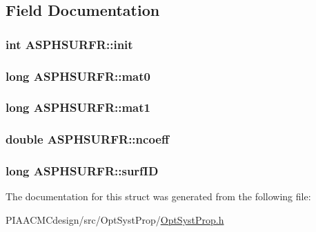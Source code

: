 \subsection{Field Documentation}
\hypertarget{structASPHSURFR_ae2386c06994cf2b5a8090bbdee2a7957}{
\subsubsection[{init}]{\setlength{\rightskip}{0pt plus 5cm}int A\+S\+P\+H\+S\+U\+R\+F\+R\+::init}}\label{structASPHSURFR_ae2386c06994cf2b5a8090bbdee2a7957}
\hypertarget{structASPHSURFR_a9c6a2f637f66b2911129ec69640f98d2}{
\subsubsection[{mat0}]{\setlength{\rightskip}{0pt plus 5cm}long A\+S\+P\+H\+S\+U\+R\+F\+R\+::mat0}}\label{structASPHSURFR_a9c6a2f637f66b2911129ec69640f98d2}
\hypertarget{structASPHSURFR_a0f31e31171389f94d70cc4ea0610e2a4}{
\subsubsection[{mat1}]{\setlength{\rightskip}{0pt plus 5cm}long A\+S\+P\+H\+S\+U\+R\+F\+R\+::mat1}}\label{structASPHSURFR_a0f31e31171389f94d70cc4ea0610e2a4}
\hypertarget{structASPHSURFR_a08fa1d82f1fc8040b051e608ea915aec}{
\subsubsection[{ncoeff}]{\setlength{\rightskip}{0pt plus 5cm}double A\+S\+P\+H\+S\+U\+R\+F\+R\+::ncoeff}}\label{structASPHSURFR_a08fa1d82f1fc8040b051e608ea915aec}
\hypertarget{structASPHSURFR_a1883e1812b5e228da6efc3fa85b88ff5}{
\subsubsection[{surf\+I\+D}]{\setlength{\rightskip}{0pt plus 5cm}long A\+S\+P\+H\+S\+U\+R\+F\+R\+::surf\+I\+D}}\label{structASPHSURFR_a1883e1812b5e228da6efc3fa85b88ff5}


The documentation for this struct was generated from the following file\+:\begin{DoxyCompactItemize}
\item 
P\+I\+A\+A\+C\+M\+Cdesign/src/\+Opt\+Syst\+Prop/\hyperlink{PIAACMCdesign_2src_2OptSystProp_2OptSystProp_8h}{Opt\+Syst\+Prop.\+h}\end{DoxyCompactItemize}
